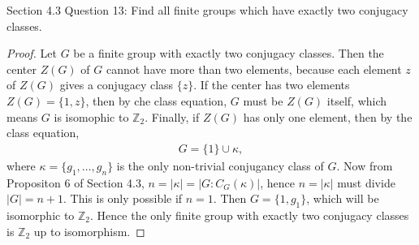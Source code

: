 Section 4.3 Question 13:
Find all finite groups which have exactly two conjugacy classes.

\begin{proof}
  Let $G$ be a finite group with exactly two conjugacy classes. Then the
  center $Z(G)$ of $G$ cannot have more than two elements, because each
  element $z$ of $Z(G)$ gives a conjugacy class $\{z\}$. If the center has
  two elements $Z(G)=\{1,z\}$, then by che class equation, $G$ must be
  $Z(G)$ itself, which means $G$ is isomophic to $\mathbb{Z}_2$. Finally,
  if $Z(G)$ has only one element, then by the class equation,
  \begin{align*}
    G = \{1\} \cup \kappa,
  \end{align*}
  where $\kappa=\{g_1,\ldots,g_n\}$ is the only non-trivial conjugancy
  class of $G$. Now from Propositon 6 of Section 4.3,
  $n=|\kappa|=|G:C_G(\kappa)|$, hence $n=|\kappa|$ must divide $|G|=n+1$.
  This is only possible if $n=1$. Then $G=\{1,g_1\}$, which will be
  isomorphic to $\mathbb{Z}_2$. Hence the only finite group with exactly
  two conjugacy classes is $\mathbb{Z}_2$ up to isomorphism.
\end{proof}
